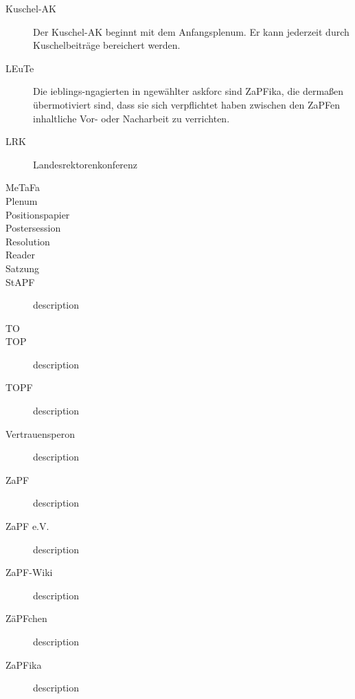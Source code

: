 \begin{description}
	\item[Kuschel-AK] Der Kuschel-AK beginnt mit dem Anfangsplenum. Er kann jederzeit durch Kuschelbeiträge bereichert werden.
	\item[LEuTe] Die ieblings-ngagierten in ngewählter askforc sind ZaPFika, die dermaßen übermotiviert sind, dass sie sich verpflichtet haben zwischen den ZaPFen inhaltliche Vor- oder Nacharbeit zu verrichten.
	\item[LRK] Landesrektorenkonferenz
	\item[MeTaFa] 
	\item[Plenum] 
	\item[Positionspapier] 
	\item[Postersession] 
	\item[Resolution] 
	\item[Reader] 
	\item[Satzung] 
	\item[StAPF] description
	\item[TO] 
	\item[TOP] description
	\item[TOPF] description
	\item[Vertrauensperon] description
	\item[ZaPF] description
	\item[ZaPF e.V.] description
	\item[ZaPF-Wiki] description
	\item[ZäPFchen] description
	\item[ZaPFika] description
\end{description}

